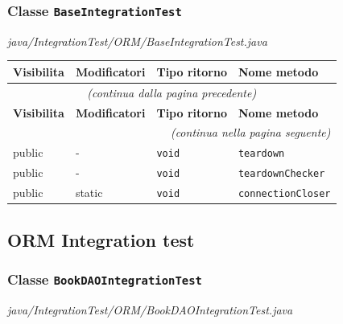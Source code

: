 \subsubsection*{Classe \texttt{BaseIntegrationTest}}\label{BaseIntegrationTest}
{\small\textit{java/IntegrationTest/ORM/BaseIntegrationTest.java}}
\vspace{4pt}

\begin{longtable}{@{}llll@{}}
\toprule
\textbf{Visibilita} & \textbf{Modificatori} & \textbf{Tipo ritorno} & \textbf{Nome metodo} \\
\midrule
\endfirsthead
\multicolumn{4}{c}{\small\itshape (continua dalla pagina precedente)} \\
\toprule
\textbf{Visibilita} & \textbf{Modificatori} & \textbf{Tipo ritorno} & \textbf{Nome metodo} \\
\midrule
\endhead
\midrule
\multicolumn{4}{r}{\small\itshape (continua nella pagina seguente)} \\
\endfoot
\bottomrule
\endlastfoot
  public & - & \texttt{void} & \texttt{teardown} \\
  public & - & \texttt{void} & \texttt{teardownChecker} \\
  public & static & \texttt{void} & \texttt{connectionCloser} \\
\end{longtable}

\subsection*{ORM Integration test}\label{ORM_IT}

\subsubsection*{Classe \texttt{BookDAOIntegrationTest}}\label{BookDAOIntegrationTest}
{\small\textit{java/IntegrationTest/ORM/BookDAOIntegrationTest.java}}
\vspace{4pt}

